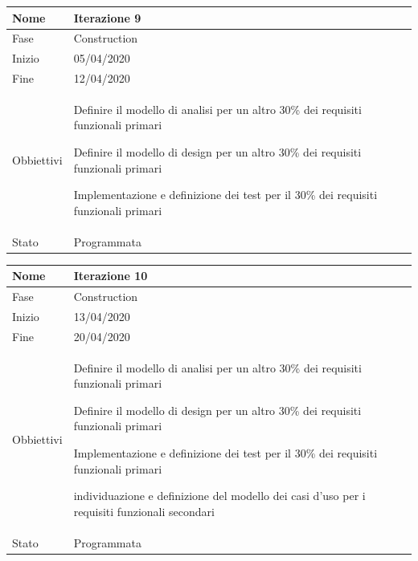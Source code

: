 \begin{center}
\begin{tabular}{ |p{2cm}|p{10cm}|  }
\hline
Nome & Iterazione 9 \\\hline
Fase & Construction \\\hline
Inizio & 05/04/2020 \\\hline
Fine &  12/04/2020  \\\hline
Obbiettivi & 
	\begin{compactitem}
		\item Definire il modello di analisi per un altro 30\% dei requisiti funzionali primari
		\item Definire il modello di design per un altro 30\% dei requisiti funzionali primari
		\item Implementazione e definizione dei test per il 30\% dei requisiti funzionali primari
		
	\end{compactitem}\\\hline
Stato &  Programmata \\\hline
\end{tabular}
\label{table:9}\newline


\begin{tabular}{ |p{2cm}|p{10cm}|  }
\hline
Nome & Iterazione 10 \\\hline
Fase & Construction \\\hline
Inizio & 13/04/2020 \\\hline
Fine &  20/04/2020  \\\hline
Obbiettivi & 
	\begin{compactitem}
		\item Definire il modello di analisi per un altro 30\% dei requisiti funzionali primari
		\item Definire il modello di design per un altro 30\% dei requisiti funzionali primari
		\item Implementazione e definizione dei test per il 30\% dei requisiti funzionali primari
		
		\item individuazione e definizione del modello dei casi d'uso per i requisiti funzionali secondari
	\end{compactitem}\\\hline
Stato &  Programmata \\\hline
\end{tabular}
\label{table:10}\newline


\end{center}
